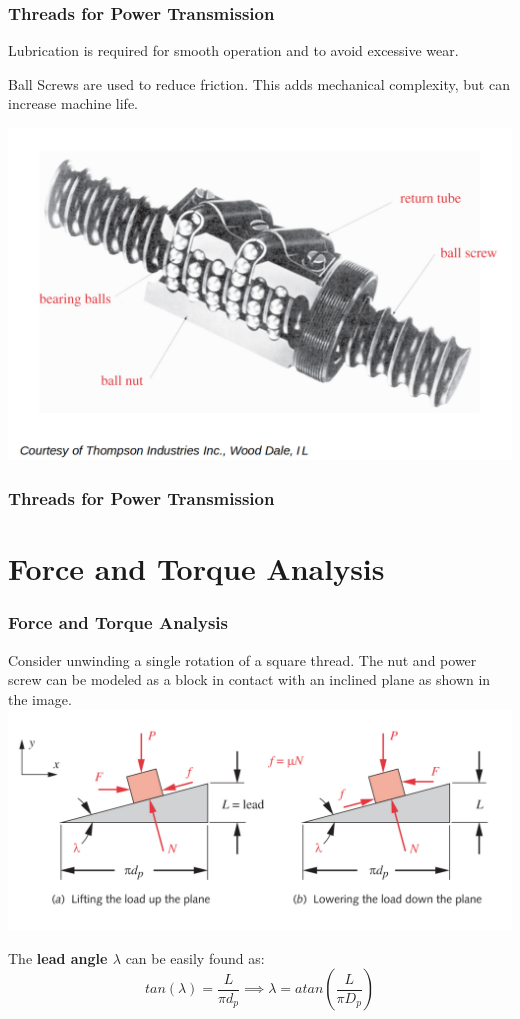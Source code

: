 \documentclass[fleqn]{beamer} %
\newcommand{\sectiontitleII}{Threads for Power Transmission}
\newcommand{\sectiontitleIII}{Force and Torque Analysis}
\begin{document}
	\begin{frame}[label=sectionII] \small
		\frametitle{\sectiontitleII}

		Lubrication is required for smooth operation and to avoid excessive wear.

		Ball Screws are used to reduce friction. This adds mechanical complexity, but can increase machine life.

		\includegraphics[scale=.15]{images/figure_15_9.png}

	\end{frame}

	\begin{frame}[label=sectionII] \small
		\frametitle{\sectiontitleII}
		
	
	\end{frame}

	
\section{\sectiontitleIII}	

	\begin{frame}[label=sectionIII] \small
		\frametitle{\sectiontitleIII}
	 		
	 	Consider unwinding a single rotation of a square thread. The nut and power screw can be modeled as a block in contact with an inclined plane as shown in the image.	
		\includegraphics[scale=.15]{images/figure_15_6.png}

		The {\bf lead angle $\lambda$} can be easily found as: 
		\[ tan(\lambda) =\frac{L}{\pi d_p} \implies \lambda = atan(\frac{L}{\pi D_p}) \]
	        
	\end{frame}  
\end{document}
